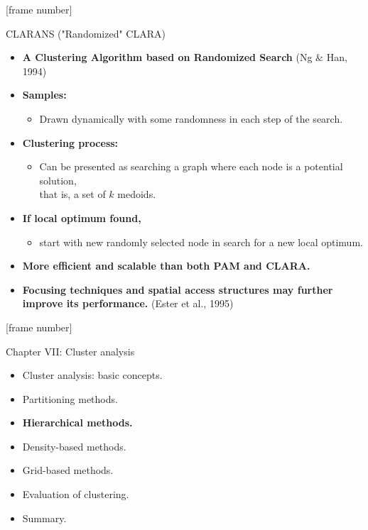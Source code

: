 \documentclass[aspectratio=169,t,xcolor=dvipsnames]{beamer}
\begin{document}
  { %
    [frame number]
    \begin{frame}{CLARANS ("Randomized" CLARA)}
      \begin{itemize}
        \item \textbf{A Clustering Algorithm based on Randomized Search} (Ng \& Han, 1994)
        \item \textbf{Samples:}
        \begin{itemize}
          \item Drawn dynamically with some randomness in each step of the search.
        \end{itemize}
        \item \textbf{Clustering process:}
        \begin{itemize}
          \item Can be presented as searching a graph where each node is a potential solution,\\
          that is, a set of $k$ medoids.
        \end{itemize}
        \item \textbf{If local optimum found,}
        \begin{itemize}
          \item start with new randomly selected node in search for a new local optimum.
        \end{itemize}
        \item \textbf{More efficient and scalable than both PAM and CLARA.}
        \item \textbf{Focusing techniques and spatial access structures may further improve its performance.} (Ester et al., 1995)
      \end{itemize}
    \end{frame}
  }

  {
    [frame number]
    \begin{frame}{Chapter VII: Cluster analysis}
        \begin{itemize}
            \item Cluster analysis: basic concepts.
            \item Partitioning methods.
            \item \textbf{Hierarchical methods.}
            \item Density-based methods.
            \item Grid-based methods.
            \item Evaluation of clustering.
            \item Summary.
        \end{itemize}
    \end{frame}
  }
\end{document}
